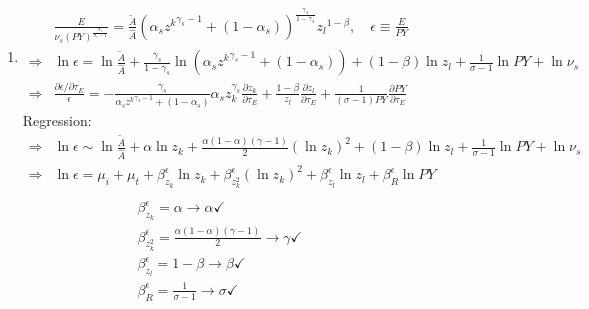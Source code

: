 \documentclass[12pt]{article} %
\begin{document}
\begin{enumerate}
    \item 
    \begin{equation*}
        \begin{split}
            & \frac{E}{\nu_{s}(PY)^{\frac{\sigma_s}{\sigma_s - 1}}}  = \frac{\tilde{A}}{\hat{A}}\left(
                \alpha_s {{z^k}}^{\gamma_s - 1} + (1-\alpha_s)
            \right) ^ {\frac{\gamma_s}{1-\gamma_s}} {{z_l}}^{1 - \beta} , \quad \epsilon \equiv  \frac{E}{PY}\\
            \Rightarrow & \ln \epsilon =  \ln \frac{\tilde{A}}{\hat{A}} + \frac{\gamma_s}{1-\gamma_s} \ln \left(
                \alpha_s {{z^k}}^{\gamma_s - 1} + (1-\alpha_s)
            \right) + (1-\beta) \ln {{z_l}} + \frac{1}{\sigma -1} \ln PY + \ln \nu_{s} \\
            \Rightarrow & \frac{\partial \epsilon/\partial \tau_E}{\epsilon} =  -\frac{\gamma_s}{\alpha_s {{z^k}}^{\gamma_s - 1} + (1-\alpha_s)} {\alpha_s z_k^{\gamma_s}} \frac{\partial z_k}{\partial \tau_E} + \frac{1-\beta}{z_l} \frac{\partial z_l}{\partial \tau_E} + \frac{1}{(\sigma -1)PY} \frac{\partial PY}{\partial \tau_E}
        \end{split}
    \end{equation*}
    Regression:
    \begin{equation*}
        \begin{split}
            \Rightarrow &\ln \epsilon \sim \ln \frac{\tilde{A}}{\hat{A}} + \alpha \ln z_k + \frac{\alpha(1-\alpha)(\gamma-1)}{2} (\ln z_k)^2 + (1-\beta) \ln {{z_l}} + \frac{1}{\sigma -1} \ln PY + \ln \nu_{s} \\
            \Rightarrow& \ln \epsilon = \mu_i + \mu_t + \beta_{z_k}^{\epsilon} \ln z_k + \beta_{z_k^2}^{\epsilon} (\ln z_k)^2 + \beta_{z_l}^{\epsilon} \ln z_l + \beta_{R}^{\epsilon} \ln PY  \\\\
            &     \qquad\qquad\qquad        \beta_{z_k}^{\epsilon} = \alpha \rightarrow \alpha \checkmark\\
            &     \qquad\qquad\qquad        \beta_{z_k^2}^{\epsilon} = \frac{\alpha(1-\alpha)(\gamma-1)}{2}\rightarrow \gamma \checkmark \\
            &     \qquad\qquad\qquad        \beta_{z_l}^{\epsilon} = 1-\beta \rightarrow \beta\checkmark\\
            &     \qquad\qquad\qquad        \beta_{R}^{\epsilon} = \frac{1}{\sigma -1} \rightarrow \sigma \checkmark
        \end{split}
    \end{equation*}



    
\end{enumerate}
\end{document}
